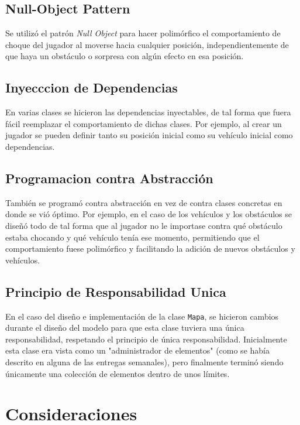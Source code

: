 \documentclass[titlepage,a4paper]{article}
\begin{document}
\subsection{Null-Object Pattern}
\label{sec:org0a37e49}

Se utilizó el patrón \emph{Null Object} para hacer polimórfico el
comportamiento de choque del jugador al moverse hacia cualquier
posición, independientemente de que haya un obstáculo o sorpresa con
algún efecto en esa posición.

\subsection{Inyecccion de Dependencias}
\label{sec:org32fb857}

En varias clases se hicieron las dependencias inyectables, de tal
forma que fuera fácil reemplazar el comportamiento de dichas
clases. Por ejemplo, al crear un jugador se pueden definir tanto su
posición inicial como su vehículo inicial como dependencias.

\subsection{Programacion contra Abstracción}
\label{sec:org3c546df}

También se programó contra abstracción en vez de contra clases
concretas en donde se vió óptimo. Por ejemplo, en el caso de los
vehículos y los obstáculos se diseñó todo de tal forma que al jugador
no le importase contra qué obstáculo estaba chocando y qué vehículo
tenía ese momento, permitiendo que el comportamiento fuese polimórfico
y facilitando la adición de nuevos obstáculos y vehículos.

\subsection{Principio de Responsabilidad Unica}
\label{sec:orga4631fc}

En el caso del diseño e implementación de la clase \texttt{Mapa}, se hicieron
cambios durante el diseño del modelo para que esta clase tuviera una
única responsabilidad, respetando el principio de única
responsabilidad. Inicialmente esta clase era vista como un
"administrador de elementos" (como se había descrito en alguna de las
entregas semanales), pero finalmente terminó siendo únicamente una
colección de elementos dentro de unos límites.

\section{Consideraciones}
\label{sec:org45a0b15}
\end{document}
